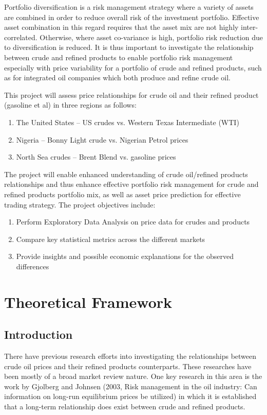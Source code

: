 \documentclass[a4paper,10pt]{article}
\begin{document}
Portfolio diversification is a risk management strategy where a variety of assets are combined in order to reduce overall risk of the investment portfolio. Effective asset combination in this regard requires that the asset mix are not highly inter-correlated. Otherwise, where asset co-variance is high, portfolio risk reduction due to diversification is reduced. It is thus important to investigate the relationship between crude and refined products to enable portfolio risk management especially with price variability for a portfolio of crude and refined products, such as for integrated oil companies which both produce and refine crude oil.\newline

This project will assess price relationships for crude oil and their refined product (gasoline et al) in three regions as follows:
      \begin{enumerate}
          \setlength{\itemindent}{.1in}
          \item The United States – US crudes vs. Western Texas Intermediate (WTI)
          \item Nigeria – Bonny Light crude vs. Nigerian Petrol prices
          \item North Sea crudes – Brent Blend vs. gasoline prices
      \end{enumerate}

	
The project will enable enhanced understanding of crude oil/refined products relationships and thus enhance effective portfolio risk management for crude and refined products portfolio mix, as well as asset price prediction for effective trading strategy.
The project objectives include:
    \begin{enumerate}
        \setlength{\itemindent}{.1in}
        \item Perform Exploratory Data Analysis on price data for crudes and products
        \item Compare key statistical metrics across the different markets
        \item Provide insights and possible economic explanations for the observed differences
    \end{enumerate}

\section{Theoretical Framework}
\subsection{Introduction}
There have previous research efforts into investigating the relationships between crude oil prices and their refined products counterparts. These researches have been mostly of a broad market review nature. One key research in this area is the work by Gjolberg and Johnsen (2003, Risk management in the oil industry: Can information on long-run equilibrium prices be utilized) \cite{joh99,gjo03} in which it is established that a long-term relationship does exist between crude and refined products.
\end{document}
